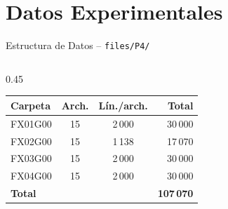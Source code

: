 \documentclass[aspectratio=169,12pt]{beamer}
\begin{document}
\section{Datos Experimentales}

\begin{frame}{Estructura de Datos -- \texttt{files/P4/}}
	\begin{columns}
		\begin{column}{0.45\textwidth}
			\centering\scriptsize
			\begin{tabular}{lccr}
				\toprule
				\textbf{Carpeta} & \textbf{Arch.}
				                 & \textbf{Lín./arch.}
				                 & \textbf{Total}                                   \\
				\midrule
				FX01G00          & 15                  & 2\,000 & 30\,000           \\
				FX02G00          & 15                  & 1\,138 & 17\,070           \\
				FX03G00          & 15                  & 2\,000 & 30\,000           \\
				FX04G00          & 15                  & 2\,000 & 30\,000           \\
				\midrule
				\textbf{Total}   &                     &        & \textbf{107\,070} \\
				\bottomrule
			\end{tabular}


\end{column}
\end{columns}
\end{frame}
\end{document}
